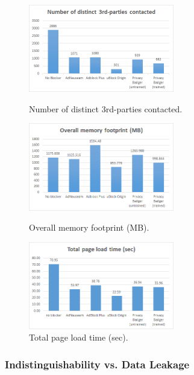 \documentclass[conference]{IEEEtran}
\begin{document}
\begin{figure}[!t]
\centering
\includegraphics[width=2.5in]{images/thirdparty.png}
\caption{Number of distinct 3rd-parties contacted.}
\label{fig:thirdparty}
\vspace{10mm}
\includegraphics[width=2.5in]{images/memory.png}
\caption{Overall memory footprint (MB).}
\label{fig:memory}
\vspace{10mm}
\includegraphics[width=2.5in]{images/loadtime.png}
\caption{Total page load time (sec).}
\label{fig:loadtime}
\end{figure}

\subsubsection{Indistinguishability vs. Data Leakage}
\end{document}
